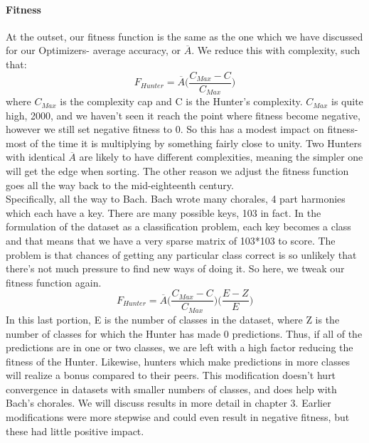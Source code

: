 \paragraph{Fitness}
At the outset, our fitness function is the same as the one which we have discussed for our Optimizers- average accuracy, or $\overline{A}$.  We reduce this with complexity, such that: $$F_{Hunter} = \overline{A} \bigg( \frac{C_{Max} - C}{C_{Max}}\bigg)$$
where $C_{Max}$ is the complexity cap and C is the Hunter's complexity.  $C_{Max}$ is quite high, 2000, and we haven't seen it reach the point where fitness become negative, however we still set negative fitness to 0.  So this has a modest impact on fitness- most of the time it is multiplying by something fairly close to unity.  Two Hunters with identical $\overline{A}$ are likely to have different complexities, meaning the simpler one will get the edge when sorting. The other reason we adjust the fitness function goes all the way back to the mid-eighteenth century.\\
Specifically, all the way to Bach.  Bach wrote many chorales, 4 part harmonies which each have a key.  There are many possible keys, 103 in fact.  In the formulation of the dataset as a classification problem, each key becomes a class and that means that we have a very sparse matrix of 103*103 to score.  The problem is that chances of getting any particular class correct is so unlikely that there's not much pressure to find new ways of doing it.  So here, we tweak our fitness function again.  $$F_{Hunter} = \overline{A} \bigg( \frac{C_{Max} - C}{C_{Max}}\bigg) \bigg( \frac{E-Z}{E}\bigg)$$
In this last portion, E is the number of classes in the dataset, where Z is the number of classes for which the Hunter has made 0 predictions.  Thus, if all of the predictions are in one or two classes, we are left with a high factor reducing the fitness of the Hunter.  Likewise, hunters which make predictions in more classes will realize a bonus compared to their peers.
This modification doesn't hurt convergence in datasets with smaller numbers of classes, and does help with Bach's chorales.  We will discuss results in more detail in chapter 3.  Earlier modifications were more stepwise and could even result in negative fitness, but these had little positive impact.
